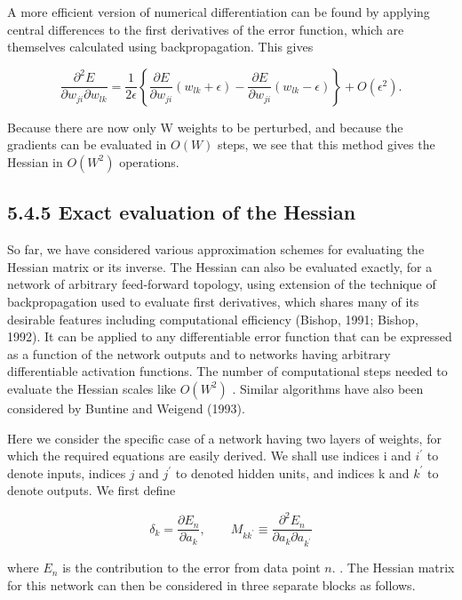 \documentclass[
  10
]{article}
\begin{document}
A more efficient version of numerical differentiation can be found by
applying central differences to the first derivatives of the error
function, which are themselves calculated using backpropagation. This
gives

\[
\frac {\partial^ {2} E}{\partial w _ {j i} \partial w _ {l k}} = \frac {1}{2 \epsilon} \left\{\frac {\partial E}{\partial w _ {j i}} (w _ {l k} + \epsilon) - \frac {\partial E}{\partial w _ {j i}} (w _ {l k} - \epsilon) \right\} + O (\epsilon^ {2}).\tag{5.91}
\]

Because there are now only W weights to be perturbed, and because the
gradients can be evaluated in \(O ( W )\) steps, we see that this method
gives the Hessian in \(O ( W ^ { 2 } )\) operations.

\subsection{5.4.5 Exact evaluation of the
Hessian}\label{exact-evaluation-of-the-hessian}

So far, we have considered various approximation schemes for evaluating
the Hessian matrix or its inverse. The Hessian can also be evaluated
exactly, for a network of arbitrary feed-forward topology, using
extension of the technique of backpropagation used to evaluate first
derivatives, which shares many of its desirable features including
computational efficiency (Bishop, 1991; Bishop, 1992). It can be applied
to any differentiable error function that can be expressed as a function
of the network outputs and to networks having arbitrary differentiable
activation functions. The number of computational steps needed to
evaluate the Hessian scales like \(O ( W ^ { 2 } )\) . Similar
algorithms have also been considered by Buntine and Weigend (1993).

Here we consider the specific case of a network having two layers of
weights, for which the required equations are easily derived. We shall
use indices i and \(i ^ { \prime }\) to denote inputs, indices \(j\) and
\(j ^ { \prime }\) to denoted hidden units, and indices k and
\(k ^ { \prime }\) to denote outputs. We first define

\[
\delta_ {k} = \frac {\partial E _ {n}}{\partial a _ {k}}, \qquad M _ {k k ^ {\prime}} \equiv \frac {\partial^ {2} E _ {n}}{\partial a _ {k} \partial a _ {k ^ {\prime}}}\tag{5.92}
\]

where \(E _ { n }\) is the contribution to the error from data point
\(n .\) . The Hessian matrix for this network can then be considered in
three separate blocks as follows.
\end{document}
